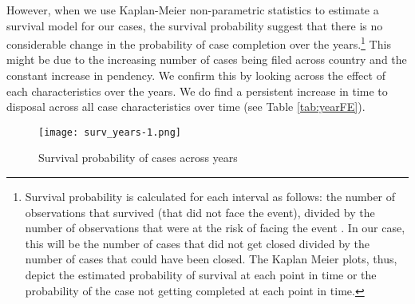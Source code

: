 However, when we use Kaplan-Meier non-parametric statistics to estimate a survival model for our cases, the survival probability suggest that there is no considerable change in the probability of case completion over the years.\footnote{Survival probability is calculated for each interval as follows: the number of observations that survived (that did not face the event), divided by the number of observations that were at the risk of facing the event \autocite{rich2010practical}. In our case, this will be the number of cases that did not get closed divided by the number of cases that could have been closed. The Kaplan Meier plots, thus, depict the estimated probability of survival at each point in time or the probability of the case not getting completed at each point in time.} This might be due to the increasing number of cases being filed across country and the constant increase in pendency. We confirm this by looking across the effect of each characteristics over the years. We do find a persistent increase in time to disposal across all case characteristics over time (see Table \ref{tab:yearFE}). 

\begin{figure}[h]
 \centering
 \caption{Survival probability of cases across years}\label{fig:yearSurvival}
 \texttt{[image: surv\_years-1.png]}
\end{figure}

